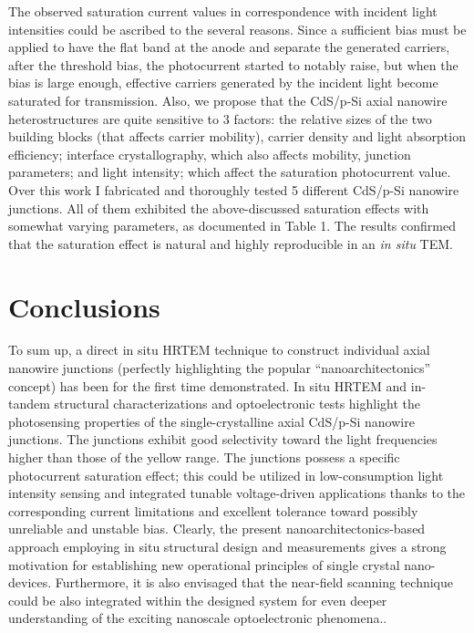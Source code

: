 The observed saturation current values in correspondence with incident light intensities could be ascribed to the several reasons. Since a sufficient bias must be applied to have the flat band at the anode and separate the generated carriers, after the threshold bias, the photocurrent started to notably raise, but when the bias is large enough, effective carriers generated by the incident light become saturated for transmission. Also, we propose that the CdS/p-Si axial nanowire heterostructures are quite sensitive to 3 factors: the relative sizes of the two building blocks (that affects carrier mobility), carrier density and light absorption efficiency; interface crystallography, which also affects mobility, junction parameters; and light intensity; which affect the saturation photocurrent value. 
Over this work I fabricated and thoroughly tested 5 different CdS/p-Si nanowire junctions. All of them exhibited the above-discussed saturation effects with somewhat varying parameters, as documented in Table 1. The results confirmed that the saturation effect is natural and highly reproducible in an \emph{in situ} TEM. 

\section{Conclusions}
To sum up, a direct in situ HRTEM technique to construct individual axial nanowire junctions (perfectly highlighting the popular “nanoarchitectonics” concept) has been for the first time demonstrated. In situ HRTEM and in-tandem structural characterizations and optoelectronic tests highlight the photosensing properties of the single-crystalline axial CdS/p-Si nanowire junctions. The junctions exhibit good selectivity toward the light frequencies higher than those of the yellow range. The junctions possess a specific photocurrent saturation effect; this could be utilized in low-consumption light intensity sensing and integrated tunable voltage-driven applications thanks to the corresponding current limitations and excellent tolerance toward possibly unreliable and unstable bias. Clearly, the present nanoarchitectonics-based approach employing in situ structural design and measurements gives a strong motivation for establishing new operational principles of single crystal nano-devices. Furthermore, it is also envisaged that the near-field scanning technique could be also integrated within the designed system for even deeper understanding of the exciting nanoscale optoelectronic phenomena.\cite{Gu2005,Xiang2012}.



